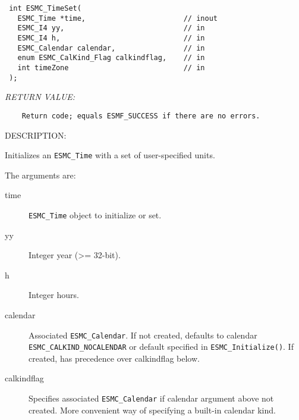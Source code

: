   
\begin{verbatim} int ESMC_TimeSet(
   ESMC_Time *time,                       // inout
   ESMC_I4 yy,                            // in
   ESMC_I4 h,                             // in
   ESMC_Calendar calendar,                // in
   enum ESMC_CalKind_Flag calkindflag,    // in
   int timeZone                           // in
 );
 \end{verbatim}{\em RETURN VALUE:}
\begin{verbatim}    Return code; equals ESMF_SUCCESS if there are no errors.\end{verbatim}
{\sf DESCRIPTION:\\ }


  
    Initializes an {\tt ESMC\_Time} with a set of user-specified units.
  
    The arguments are:
    \begin{description}
    \item[time]
      {\tt ESMC\_Time} object to initialize or set.
    \item[yy]
      Integer year (>= 32-bit).
    \item[h]
      Integer hours.
    \item[calendar]
      Associated {\tt ESMC\_Calendar}.  If not created, defaults to calendar
      {\tt ESMC\_CALKIND\_NOCALENDAR} or default specified in
      {\tt ESMC\_Initialize()}.  If created, has precedence over
      calkindflag below.
    \item[calkindflag]
      Specifies associated {\tt ESMC\_Calendar} if calendar argument above
      not created.  More convenient way of specifying a built-in calendar kind.
    \end{description}
  
\setlength{\parskip}{\oldparskip}
\setlength{\parindent}{\oldparindent}
\setlength{\baselineskip}{\oldbaselineskip}
